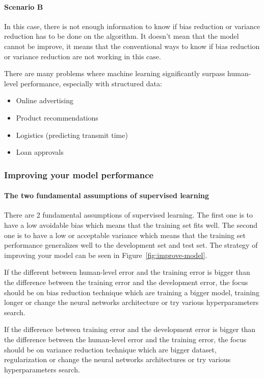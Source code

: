 \documentclass[UTF8]{article}
\begin{document}
\paragraph{Scenario B}
In this case, there is not enough information to know if bias reduction or variance reduction has
to be done on the algorithm. It doesn't mean that the model cannot be improve, it means that the
conventional ways to know if bias reduction or variance reduction are not working in this case.

There are many problems where machine learning significantly surpass human-level performance,
especially with structured data:
\begin{itemize}
    \item Online advertising
    \item Product recommendations
    \item Logistics (predicting transmit time)
    \item Loan approvals
\end{itemize}

\subsubsection{Improving your model performance}
\paragraph{The two fundamental assumptions of supervised learning}
There are 2 fundamental assumptions of supervised learning. The first one is to have a low
avoidable bias which means that the training set fits well. The second one is to have a low or
acceptable variance which means that the training set performance generalizes well to the
development set and test set. The strategy of improving your model can be seen in
Figure~\ref{fig:improve-model}.

If the different between human-level error and the training error is bigger than the difference
between the training error and the development error, the focus should be on bias reduction
technique which are training a bigger model, training longer or change the neural networks
architecture or try various hyperparameters search.

If the difference between training error and the development error is bigger than the difference
between the human-level error and the training error, the focus should be on variance reduction
technique which are bigger dataset, regularization or change the neural networks architectures or
try various hyperparameters search.
\end{document}
